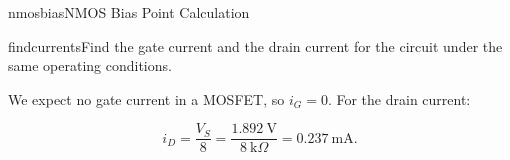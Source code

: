 \begin{mainquestion}{nmosbias}{NMOS Bias Point Calculation}
\begin{partquestion}{findcurrents}{Find the gate current and the drain current for the circuit under the same operating conditions.}
\begin{answer}
We expect no gate current in a MOSFET, so $i_{G} = 0$. For the drain current:

\[
i_{D} = \frac{V_{S}}{8} = \frac{1.892\ \text{V}}{8\ \text{k}\Omega} = 0.237\ \text{mA}.
\]
\end{answer}
\end{partquestion}

\end{mainquestion}

